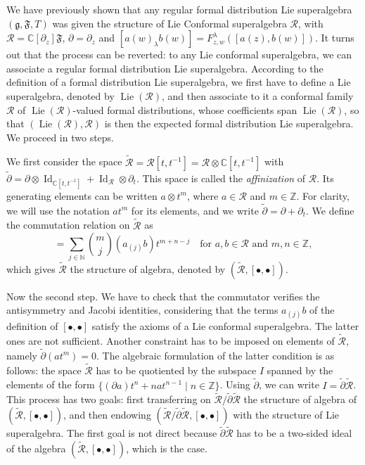 \documentclass[a4paper, 12pt, reqno]{amsart}
\theoremstyle{remark}
\numberwithin{equation}{subsection}
\DeclareMathOperator{\Id}{Id}
\DeclareMathOperator{\Lie}{Lie}
\begin{document}
We have previously shown that any regular formal distribution Lie superalgebra $(\mathfrak{g}, \mathfrak{F}, T)$ was given the structure of Lie Conformal superalgebra $\mathcal{R}$, with $\mathcal{R} = \mathbb{C}[\partial_z]\mathfrak{F}$, $\partial = \partial_z$ and $[a(w)_{\lambda}b(w)] = F^{\lambda}_{z, w}([a(z), b(w)])$.
It turns out that the process can be reverted: to any Lie conformal superalgebra, we can associate a regular formal distribution Lie superalgebra.
According to the definition of a formal distribution Lie superalgebra, we first have to define a Lie superalgebra, denoted by $\Lie(\mathcal{R})$, and then associate to it a conformal family $\mathcal{R}$ of $\Lie(\mathcal{R})$-valued formal distributions, whose coefficients span $\Lie(\mathcal{R})$, so that $(\Lie(\mathcal{R}), \mathcal{R})$ is then the expected formal distribution Lie superalgebra.
We proceed in two steps.

We first consider the space $\widetilde{\mathcal{R}} = \mathcal{R}[t, t^{-1}] = \mathcal{R} \otimes \mathbb{C}[t, t^{-1}]$ with $\widetilde{\partial} = \partial\otimes\Id_{\mathbb{C}[t, t^{-1}]} + \Id_{\mathcal{R}}\otimes \partial_t$.
This space is called the \emph{affinization} of $\mathcal{R}$.
Its generating elements can be written $a\otimes t^m$, where $a \in \mathcal{R}$ and $m \in \mathbb{Z}$.
For clarity, we will use the notation $at^m$ for its elements, and we write $\widetilde{\partial} = \partial + \partial_t$.
We define the commutation relation on $\widetilde{\mathcal{R}}$ as
\begin{equation*}
  [at^m, bt^n] = \sum_{j \in \mathbb{N}}\binom{m}{j}(a_{(j)}b)t^{m + n - j} \quad \text{for }a, b \in \mathcal{R}\text{ and }m, n \in \mathbb{Z},
\end{equation*}
which gives $\widetilde{\mathcal{R}}$ the structure of algebra, denoted by $(\widetilde{\mathcal{R}},[\bullet, \bullet])$.

Now the second step.
We have to check that the commutator verifies the antisymmetry and Jacobi identities, considering that the terms $a_{(j)}b$ of the definition of $[\bullet, \bullet]$ satisfy the axioms of a Lie conformal superalgebra.
The latter ones are not sufficient.
Another constraint has to be imposed on elements of $\widetilde{\mathcal{R}}$, namely $\widetilde{\partial}(at^m) = 0$.
The algebraic formulation of the latter condition is as follows: the space $\widetilde{\mathcal{R}}$ has to be quotiented by the subspace $I$ spanned by the elements of the form $\{(\partial a)t^n + nat^{n - 1} \mid n \in \mathbb{Z}\}$.
Using $\widetilde{\partial}$, we can write $I = \widetilde{\partial}\widetilde{\mathcal{R}}$.
This process has two goals: first transferring on $\widetilde{\mathcal{R}}/\widetilde{\partial}\widetilde{\mathcal{R}}$ the structure of algebra of $(\widetilde{\mathcal{R}}, [\bullet, \bullet])$, and then endowing $(\widetilde{\mathcal{R}}/\widetilde{\partial}\widetilde{\mathcal{R}}, [\bullet, \bullet])$ with the structure of Lie superalgebra.
The first goal is not direct because $\widetilde{\partial}\widetilde{\mathcal{R}}$ has to be a two-sided ideal of the algebra $(\widetilde{\mathcal{R}}, [\bullet, \bullet])$, which is the case.
\end{document}
